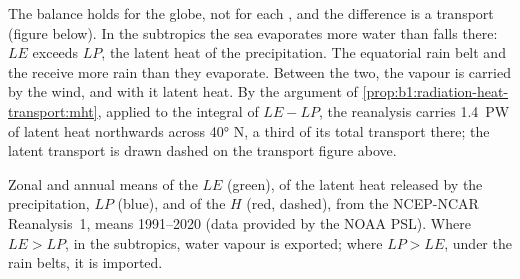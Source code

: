 The balance holds for the globe, not for each , and the difference is a
transport (figure below). In the subtropics the sea evaporates more water than
falls there: $LE$ exceeds $LP$, the latent heat of the precipitation. The
equatorial rain belt and the  receive more rain than they
evaporate. Between the two, the vapour is carried by the wind, and with it
latent heat. By the argument of \cref{prop:b1:radiation-heat-transport:mht},
applied to the integral of $LE - LP$, the reanalysis carries
\qty{1.4}{PW} of latent heat northwards across \ang{40} N, a third of its total
transport there; the latent transport is drawn dashed on the transport figure above.

\begin{omfigure}

{\small Zonal and annual means of the  $LE$ (green), of the latent
heat released by the precipitation, $LP$ (blue), and of the 
$H$ (red, dashed), from the NCEP-NCAR Reanalysis~1, means 1991--2020 (data provided
by the NOAA PSL). Where $LE > LP$, in the subtropics, water vapour is exported;
where $LP > LE$, under the rain belts, it is imported.}
\label{fig:b1:radiation-heat-transport:surface}
\end{omfigure}


